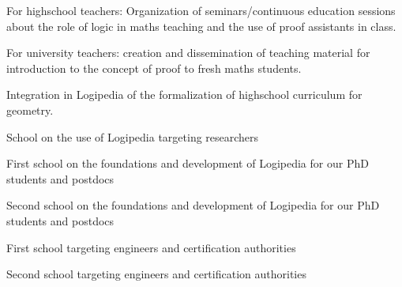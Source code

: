 \begin{workpackage}[id=dissemination,wphases=0-48,type=MGT,
  short=Dissemination,%
  title={Dissemination, communication and exploitation},
  lead=Inr]
\begin{wpdelivs}
  \begin{wpdeliv}[due=18,miles=???,id=continuoused,dissem=PU,nature=other,lead=Str]{
 For highschool teachers: Organization of seminars/continuous education sessions about the role of logic in maths teaching and the use of proof assistants in class.}
  \end{wpdeliv}

  \begin{wpdeliv}[due=18,miles=???,id=course-proof,dissem=PU,nature=other,lead=Str]{ For university teachers: creation and dissemination of teaching material for introduction to the concept of proof to fresh maths students.}
  \end{wpdeliv}

  \begin{wpdeliv}[due=18,miles=???,id=geom-curriculum,dissem=PU,nature=other,lead=Str]{ Integration in Logipedia of the formalization of highschool curriculum for geometry.}
  \end{wpdeliv}

  \begin{wpdeliv}[due=36,miles=???,id=school-researchers,dissem=PU,nature=other,lead=Bir]{School on the use of Logipedia targeting researchers}
  \end{wpdeliv}

  \begin{wpdeliv}[due=12,miles=???,id=school-first-phd,dissem=PU,nature=other,lead=Bir]{First school on the foundations and development of Logipedia for our PhD students and postdocs}
  \end{wpdeliv}

  \begin{wpdeliv}[due=24,miles=???,id=school-second-phd,dissem=PU,nature=other,lead=Bir]{Second school on the foundations and development of Logipedia for our PhD students and postdocs}
  \end{wpdeliv}

  \begin{wpdeliv}[due=12,miles=???,id=school-first-certif,dissem=PU,nature=other,lead=Irt]{First school targeting engineers and certification authorities}
  \end{wpdeliv}

  \begin{wpdeliv}[due=24,miles=???,id=school-second-certif,dissem=PU,nature=other,lead=Irt]{Second school targeting engineers and certification authorities}
  \end{wpdeliv}



\end{wpdelivs}

\end{workpackage}


